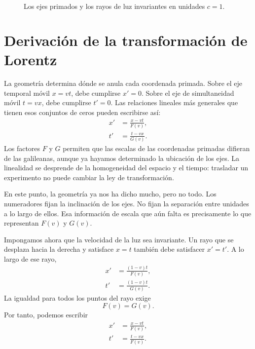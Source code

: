 \begin{figure}[H]\centering
{}\caption{Los ejes primados y los rayos de luz invariantes en unidades \(c=1\).}\end{figure}

\section{Derivación de la transformación de Lorentz}

La geometría determina dónde se anula cada coordenada primada. Sobre el eje temporal móvil \(x=vt\), debe cumplirse \(x'=0\). Sobre el eje de simultaneidad móvil \(t=vx\), debe cumplirse \(t'=0\). Las relaciones lineales más generales que tienen esos conjuntos de ceros pueden escribirse así:
\begin{align}
x'&=\frac{x-vt}{F(v)},\\
t'&=\frac{t-vx}{G(v)}.
\label{eq:fg-ansatz}
\end{align}
Los factores \(F\) y \(G\) permiten que las escalas de las coordenadas primadas difieran de las galileanas, aunque ya hayamos determinado la ubicación de los ejes. La linealidad se desprende de la homogeneidad del espacio y el tiempo: trasladar un experimento no puede cambiar la ley de transformación.

En este punto, la geometría ya nos ha dicho mucho, pero no todo. Los numeradores fijan la inclinación de los ejes. No fijan la separación entre unidades a lo largo de ellos. Esa información de escala que aún falta es precisamente lo que representan \(F(v)\) y \(G(v)\).

Impongamos ahora que la velocidad de la luz sea invariante. Un rayo que se desplaza hacia la derecha y satisface \(x=t\) también debe satisfacer \(x'=t'\). A lo largo de ese rayo,
\begin{align}
x'&=\frac{(1-v)t}{F(v)},\\
t'&=\frac{(1-v)t}{G(v)}.
\end{align}
La igualdad para todos los puntos del rayo exige
\begin{equation}
F(v)=G(v).
\end{equation}
Por tanto, podemos escribir
\begin{align}
x'&=\frac{x-vt}{F(v)},\\
t'&=\frac{t-vx}{F(v)}.
\label{eq:common-f}
\end{align}


